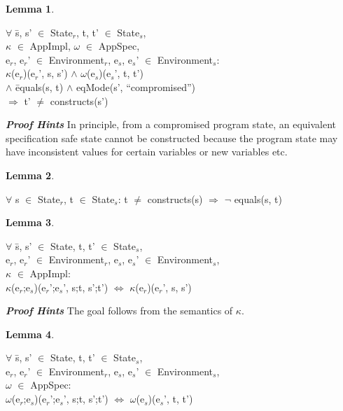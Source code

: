 \documentclass[conference]{IEEEtran}
\newtheorem{lem}{Lemma}
\begin{document}
\begin{lem}  \end{lem}\begin{tabbing}$\forall$ \=s, s' $\in$ State$_r$, t, t' $\in$ State$_s$, 
\\\>$\kappa$ $\in$ AppImpl, $\omega$ $\in$ AppSpec, 
\\\>e$_r$, e$_r$' $\in$ Environment$_r$, e$_s$, e$_s$' $\in$ Environment$_s$:
\\\>\textlbrackdbl $\kappa$\textrbrackdbl(e$_r$)(e$_r$', s, s') $\wedge$ \textlbrackdbl $\omega$\textrbrackdbl(e$_s$)(e$_s$', t, t') 
\\\>$\wedge$ \=equals(s, t) $\wedge$ eqMode(s', ``compromised'') 
\\\>\>$\Rightarrow$ t' $\neq$ constructs(s')
 \end{tabbing}
\textbf{\em Proof Hints}
In principle, from a compromised program state, an equivalent specification safe state cannot be constructed because the program state may have inconsistent values for certain variables or new variables etc.
 \begin{lem} \end{lem}\begin{tabbing}$\forall$ s $\in$ State$_r$, t $\in$ State$_s$: t $\neq$ constructs(s) $\Rightarrow$ $\neg$ equals(s, t)\end{tabbing}
\begin{lem} \end{lem} \begin{tabbing} $\forall$ \=s, s' $\in$ State, t, t' $\in$ State$_s$, 
\\\>e$_r$, e$_r$' $\in$ Environment$_r$, e$_s$, e$_s$' $\in$ Environment$_s$, 
\\\> $\kappa$ $\in$ AppImpl:
\\\>\textlbrackdbl $\kappa$\textrbrackdbl(e$_r$;e$_s$)(e$_r$';e$_s$', s;t, s';t') $\Leftrightarrow$ \textlbrackdbl $\kappa$\textrbrackdbl(e$_r$)(e$_r$', s, s')
\end{tabbing}
\textbf{\em Proof Hints}
The goal follows from the semantics of \emph{$\kappa$}.
\begin{lem} \end{lem}\begin{tabbing} $\forall$ \=s, s' $\in$ State, t, t' $\in$ State$_s$, 
\\\>e$_r$, e$_r$' $\in$ Environment$_r$, e$_s$, e$_s$' $\in$ Environment$_s$, 
\\\> $\omega$ $\in$ AppSpec: 
\\\>\textlbrackdbl $\omega$\textrbrackdbl(e$_r$;e$_s$)(e$_r$';e$_s$', s;t, s';t') $\Leftrightarrow$ \textlbrackdbl $\omega$\textrbrackdbl(e$_s$)(e$_s$', t, t')
\end{tabbing}
\end{document}
